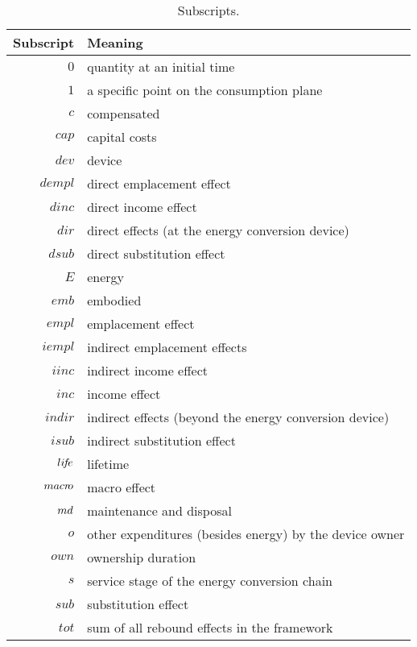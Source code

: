 
\begin{table}
\centering
\caption{Subscripts.}
\begin{tabular}{r l}
  \toprule
  Subscript & Meaning \\
  \midrule
  $0$      & quantity at an initial time \\
  $1$      & a specific point on the consumption plane \\
  $c$      & compensated \\
  $cap$    & capital costs \\
  $dev$    & device \\
  $dempl$  & direct emplacement effect \\
  $dinc$   & direct income effect \\
  $dir$    & direct effects (at the energy conversion device) \\
  $dsub$   & direct substitution effect \\
  $E$      & energy \\
  $emb$    & embodied \\
  $empl$   & emplacement effect \\
  $iempl$  & indirect emplacement effects \\
  $iinc$   & indirect income effect \\
  $inc$    & income effect \\
  $indir$  & indirect effects (beyond the energy conversion device) \\
  $isub$   & indirect substitution effect \\
  $li\!f\!e$  & lifetime \\
  $macr\!o$ & macro effect \\
  $md$    & maintenance and disposal \\
  $o$      & other expenditures (besides energy) by the device owner \\
  $own$    & ownership duration \\
  $s$      & service stage of the energy conversion chain \\
  $sub$    & substitution effect \\
  $tot$    & sum of all rebound effects in the framework \\
  \bottomrule
\end{tabular}
\label{tab:subscripts}
\end{table}


